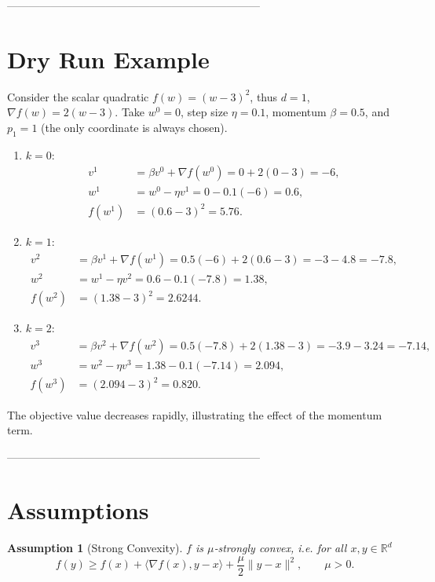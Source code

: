 \documentclass{article}
\newtheorem{assumption}{Assumption}
\newcommand{\R}{\mathbb{R}}
\begin{document}
---------------------------------------------------------------------

\section*{Dry Run Example}
Consider the scalar quadratic $f(w)=(w-3)^{2}$, thus $d=1$,
$\nabla f(w)=2(w-3)$.  
Take $w^{0}=0$, step size $\eta=0.1$, momentum $\beta=0.5$, and $p_{1}=1$ (the only
coordinate is always chosen).

\begin{enumerate}[label=Iteration \arabic*:, leftmargin=*]
\item $k=0$: 
\[
\begin{aligned}
v^{1}&=\beta v^{0}+ \nabla f(w^{0})
      =0+2(0-3)=-6,\\
w^{1}&=w^{0}-\eta v^{1}=0-0.1(-6)=0.6,\\
f(w^{1})&=(0.6-3)^{2}=5.76.
\end{aligned}
\]

\item $k=1$: 
\[
\begin{aligned}
v^{2}&=\beta v^{1}+ \nabla f(w^{1})
      =0.5(-6)+2(0.6-3)= -3-4.8=-7.8,\\
w^{2}&=w^{1}-\eta v^{2}=0.6-0.1(-7.8)=1.38,\\
f(w^{2})&=(1.38-3)^{2}=2.6244.
\end{aligned}
\]

\item $k=2$: 
\[
\begin{aligned}
v^{3}&=\beta v^{2}+ \nabla f(w^{2})
      =0.5(-7.8)+2(1.38-3)= -3.9-3.24=-7.14,\\
w^{3}&=w^{2}-\eta v^{3}=1.38-0.1(-7.14)=2.094,\\
f(w^{3})&=(2.094-3)^{2}=0.820.
\end{aligned}
\]
\end{enumerate}
The objective value decreases rapidly, illustrating the effect of the
momentum term.

---------------------------------------------------------------------

\section*{Assumptions}
\begin{assumption}[Strong Convexity]\label{as:strong}
$f$ is $\mu$‑strongly convex, i.e. for all $x,y\in\R^{d}$
\[
f(y)\ge f(x)+\langle\nabla f(x),y-x\rangle+\frac{\mu}{2}\|y-x\|^{2},
\qquad \mu>0.
\]
\end{assumption}
\end{document}

